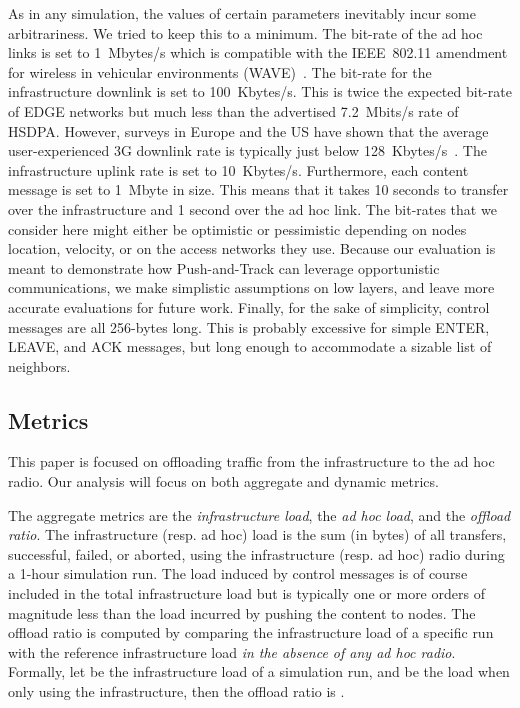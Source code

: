 \documentclass[preprint]{elsarticle}
\begin{document}
As in any simulation, the values of certain parameters inevitably incur some arbitrariness. We tried to keep this to a minimum. The bit-rate of the ad hoc links is set to 1~Mbytes/s which is compatible with the IEEE~802.11 amendment for wireless in vehicular environments (WAVE)~\cite{80211p}. The bit-rate for the infrastructure downlink is set to 100~Kbytes/s. This is twice the expected bit-rate of EDGE networks but much less than the advertised 7.2~Mbits/s rate of HSDPA. However, surveys in Europe and the US have shown that the average user-experienced 3G downlink rate is typically just below 128~Kbytes/s~\cite{wired_3g,ufc_3g}. The infrastructure uplink rate is set to 10~Kbytes/s. Furthermore, each content message is set to 1~Mbyte in size. This means that it takes 10 seconds to transfer over the infrastructure and 1 second over the ad hoc link. The bit-rates that we consider here might either be optimistic or pessimistic depending on nodes location, velocity, or on the access networks they use. Because our evaluation is meant to demonstrate how Push-and-Track can leverage opportunistic communications, we make simplistic assumptions on low layers, and leave more accurate evaluations for future work. Finally, for the sake of simplicity, control messages are all 256-bytes long. This is probably excessive for simple \textsf{ENTER}, \textsf{LEAVE}, and \textsf{ACK} messages, but long enough to accommodate a sizable list of neighbors.

\subsection{Metrics}
\label{subsec:metrics}
This paper is focused on offloading traffic from the infrastructure to the ad hoc radio. Our analysis will focus on both aggregate and dynamic metrics.

The aggregate metrics are the \emph{infrastructure load}, the \emph{ad hoc load}, and the \emph{offload ratio}. The infrastructure (resp. ad hoc) load is the sum (in bytes) of all transfers, successful, failed, or aborted, using the infrastructure (resp. ad hoc) radio during a 1-hour simulation run. The load induced by control messages is of course included in the total infrastructure load but is typically one or more orders of magnitude less than the load incurred by pushing the content to nodes. The offload ratio is computed by comparing the infrastructure load of a specific run with the reference infrastructure load \emph{in the absence of any ad hoc radio}. Formally, let  be the infrastructure load of a simulation run, and  be the load when only using the infrastructure, then the offload ratio is .
\end{document}
